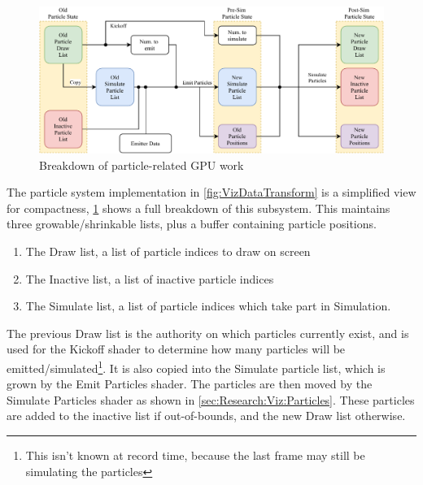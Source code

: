 \pagebreak
\begin{figure}[t]
    \centering
    \includegraphics[width=\linewidth]{Ch48Implementation/figures/FinalReport_VizData_Particles.pdf}
    \caption{Breakdown of particle-related GPU work}
    \label{fig:VizDataParticles}
\end{figure}
The particle system implementation in \cref{fig:VizDataTransform} is a simplified view for compactness, \cref{fig:VizDataParticles} shows a full breakdown of this subsystem.
This maintains three growable/shrinkable lists, plus a buffer containing particle positions.
\begin{enumerate}
    \item The Draw list, a list of particle indices to draw on screen
    \item The Inactive list, a list of inactive particle indices
    \item The Simulate list, a list of particle indices which take part in Simulation.
\end{enumerate}
The previous Draw list is the authority on which particles currently exist, and is used for the Kickoff shader to determine how many particles will be emitted/simulated\footnote{This isn't known at record time, because the last frame may still be simulating the particles}.
It is also copied into the Simulate particle list, which is grown by the Emit Particles shader.
The particles are then moved by the Simulate Particles shader as shown in \cref{sec:Research:Viz:Particles}.
These particles are added to the inactive list if out-of-bounds, and the new Draw list otherwise.

